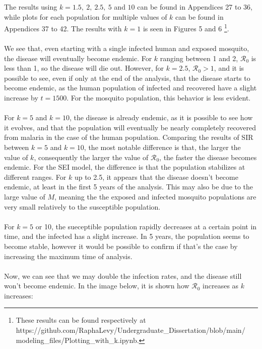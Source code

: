 The results using $k=1.5, \ 2, \ 2.5, \ 5$ and $10$ can be found in Appendices 
27 to 36, while plots for each population for multiple values 
of $k$ can be found in Appendices 37 to 42. The results with $k=1$ 
is seen in Figures 5 and 6 \footnote{These results can be found respectively at
https://github.com/RaphaLevy/Undergraduate\_Dissertation/blob/main/
\\modeling\_files/Plotting\_with\_k.ipynb.}.
\\\\
We see that, even starting with a single infected 
human and exposed mosquito,
the disease will eventually become endemic. For $k$ ranging between 1 and 2,
$\mathcal{R}_0$ is less than 1, so the disease will die out. However, for $k=2.5$, 
$\mathcal{R}_0>1$, and it is possible to see, even if only at the end of the analysis, that the disease 
starts to become endemic, as the human population of infected and recovered 
have a slight increase by $t=1500$. For the mosquito population, this 
behavior is less evident.
\\\\
For $k=5$ and $k=10$, the disease is already endemic, as it is possible to see
how it evolves, and that the population will eventually be nearly completely 
recovered from malaria in the case of the human population. Comparing the results 
of SIR between $k=5$ and $k=10$, the most notable difference is that, the larger 
the value of $k$, consequently the larger the value of $\mathcal{R}_0$, 
the faster the disease becomes endemic. For the SEI model, the difference 
is that the population stabilizes at different ranges. For $k$ up to 2.5, 
it appears that the disease doesn't become endemic, at least in the first 5 years 
of the analysis. This may also be due to the large value of $M$, meaning the the exposed and 
infected mosquito populations are very small relatively to the susceptible population.
\\\\
For $k=5$ or 10, the sueceptible population rapidly decreases at 
a certain point in time, and the infected has a slight increase. In 5 years,
the population seems to become stable, however it would be possible to confirm 
if that's the case by increasing the maximum time of analysis.
\\\\
Now, we can see that we may double the infection rates, and the disease still 
won't become endemic. In the image below, it is shown how $\mathcal{R}_0$ 
increases as $k$ increases:
